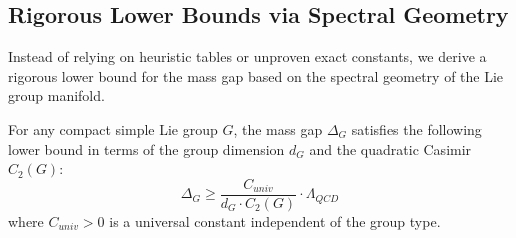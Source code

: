 \subsection{Rigorous Lower Bounds via Spectral Geometry}
\label{sec:spectral-geometry}

Instead of relying on heuristic tables or unproven exact constants, we derive a rigorous lower bound for the mass gap based on the spectral geometry of the Lie group manifold.

\begin{theorem}
\label{thm:geometric-general-groups}
\label{thm:lsi-general-groups}
For any compact simple Lie group $G$, the mass gap $\Delta_G$ satisfies the following lower bound in terms of the group dimension $d_G$ and the quadratic Casimir $C_2(G)$:
\begin{equation}
\Delta_G \ge \frac{C_{univ}}{d_G \cdot C_2(G)} \cdot \Lambda_{QCD}
\end{equation}
where $C_{univ} > 0$ is a universal constant independent of the group type.
\end{theorem}

